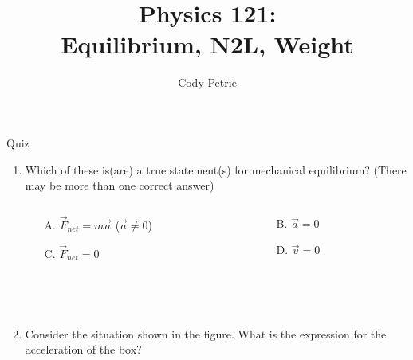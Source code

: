 \documentclass{beamer}
\title[{\color{white}{Chapters 6.1-3}}]{Physics 121: \\ Equilibrium, N2L, Weight}
\author{Cody Petrie}
\institute{Mesa Community College}
\date{}
\begin{document}
\begin{frame}
\titlepage
\end{frame}



\begin{frame}{Quiz}
\begin{enumerate}
   \item Which of these is(are) a true statement(s) for mechanical equilibrium? (There may be more than one correct answer)
   \begin{columns}
      \begin{column}{0.5\textwidth}
      \begin{enumerate}
         \item[A.] $\vec{F}_{net} = m\vec{a}$ ($\vec{a} \ne 0$)
         \item[C.] $\vec{F}_{net} = 0$
      \end{enumerate}
      \end{column}
      \begin{column}{0.5\textwidth}
      \begin{enumerate}
         \item[B.] $\vec{a}=0$
         \item[D.] $\vec{v}=0$
      \end{enumerate}
      \end{column}
   \end{columns}
   ~\\~
   \item Consider the situation shown in the figure. What is the expression for the acceleration of the box?
   \begin{columns}
   \begin{column}{0.35\textwidth}
   \begin{center}

\end{center}
\end{column}
\end{columns}
\end{enumerate}
\end{frame}
\end{document}
